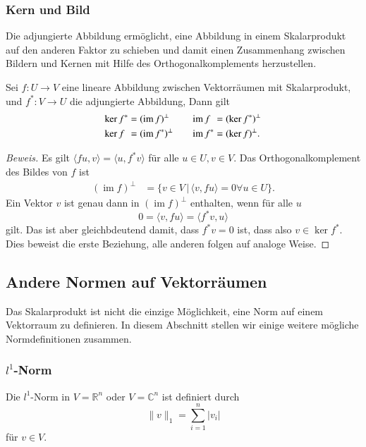 \subsubsection{Kern und Bild}
Die adjungierte Abbildung ermöglicht, eine Abbildung in einem
Skalarprodukt auf den anderen Faktor zu schieben und damit
einen Zusammenhang zwischen Bildern und Kernen mit Hilfe des
Orthogonalkomplements herzustellen.

\begin{satz}
Sei $f\colon U\to V$ eine lineare Abbildung zwischen Vektorräumen
mit Skalarprodukt, und $f^*\colon V \to U$ die adjungierte Abbildung,
Dann gilt
\[
\begin{aligned}
\ker f^*
&=
(\operatorname{im}f)^\perp
&&
&
\operatorname{im}f\phantom{\mathstrut^*}
&=
(\ker f^*)^\perp
\\
\ker f\phantom{\mathstrut^*}
&=
(\operatorname{im}f^*)^\perp
&
&&
\operatorname{im}f^*
&=
(\ker f)^\perp.
\end{aligned}
\]
\end{satz}

\begin{proof}[Beweis]
Es gilt $\langle fu,v\rangle = \langle u,f^*v\rangle$ für
alle $u\in U, v\in V$.
Das Orthogonalkomplement des Bildes von $f$ ist
\begin{align*}
(\operatorname{im} f)^\perp
&=
\{
v\in V
\,|\,
\langle v, fu\rangle=0\forall u\in U
\}.
\end{align*}
Ein Vektor $v$ ist genau dann in $(\operatorname{im}f)^\perp$ enthalten,
wenn für alle $u$ 
\[
0
=
\langle v,fu\rangle
=
\langle f^*v,u\rangle
\]
gilt.
Das ist aber gleichbdeutend damit, dass $f^*v=0$ ist, dass also 
$v\in\ker f^*$.
Dies beweist die erste Beziehung, alle anderen folgen auf analoge Weise.
\end{proof}

\subsection{Andere Normen auf Vektorräumen
\label{buch:subsection:andere-normen}}
Das Skalarprodukt ist nicht die einzige Möglichkeit, eine Norm auf einem
Vektorraum zu definieren.
In diesem Abschnitt stellen wir einige weitere mögliche Normdefinitionen
zusammen.

\subsubsection{$l^1$-Norm}
\begin{definition}
Die $l^1$-Norm in $V=\mathbb{R}^n$ oder $V=\mathbb{C}^n$ ist definiert durch
%
\[
\| v\|_1
=
\sum_{i=1}^n |v_i|
\]
für $v\in V$.
\end{definition}

